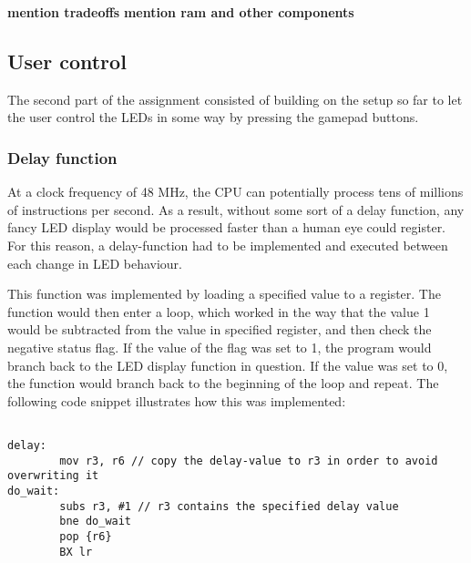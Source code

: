 {\bf mention  tradeoffs}
{\bf mention ram and other components}   




  
\subsection{User control}\label{ch:user_control}

The second part of the assignment consisted of building on the setup so far to let the user control the LEDs in some way by pressing the gamepad buttons.

\subsubsection{Delay function}

At a clock frequency of 48 MHz, the CPU can potentially process tens of millions of instructions per second. As a result, without some sort of a delay function, any fancy LED display would be processed faster than a human eye could register. For this reason, a delay-function had to be implemented and executed between each change in LED behaviour.

This function was implemented by loading a specified value to a register. The function would then enter a loop, which worked in the way that the value 1 would be subtracted from the value in specified register, and then check the negative status flag. If the value of the flag was set to 1, the program would branch back to the LED display function in question. If the value was set to 0, the function would branch back to the beginning of the loop and repeat. The following code snippet illustrates how this was implemented:

\begin{lstlisting}

delay:
        mov r3, r6 // copy the delay-value to r3 in order to avoid overwriting it
do_wait:
        subs r3, #1 // r3 contains the specified delay value
        bne do_wait
        pop {r6}
        BX lr
        
\end{lstlisting}


